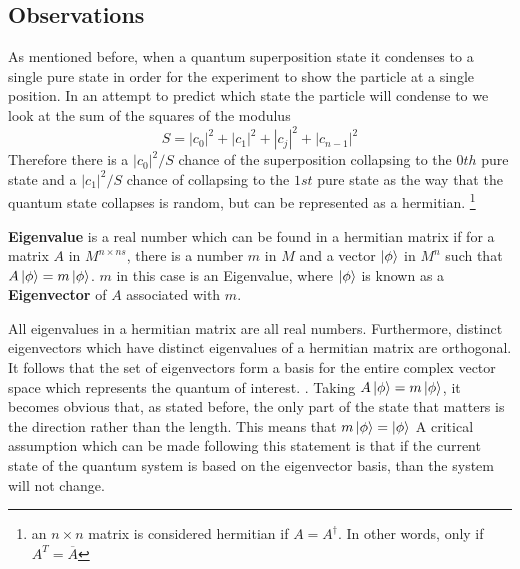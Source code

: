 \documentclass[12pt]{article}
\begin{document}
\subsection{Observations}
As mentioned before, when a quantum superposition state it condenses to a single pure state in order for the experiment to show the particle at a single position. In an attempt to predict which state the particle will condense to we look at the sum of the squares of the modulus\cite{intro} 
$$S = \left|c_0\right|^2 + \left|c_1\right|^2 + \left|c_{j}\right|^2 +\left|c_{n-1}\right|^2$$ 
Therefore there is a $\left|c_0\right|^2\!/S$ chance of the superposition collapsing to the $0th$ pure state and a $\left|c_1\right|^2\!/S$ chance of collapsing to the $1st$ pure state as the way that the quantum state collapses is random, but can be represented as a hermitian.
\footnote{an $ n\times n $ matrix is considered hermitian if $A = A^\dagger $. In other words, only if $ A^T = \overline{A} $}
\par
\textbf{Eigenvalue} is a real number which can be found in a hermitian matrix if for a matrix $A$ in $M^{n\times ns}$, there is a number $m$ in $M$ and a vector $\ket{\phi}$ in $M^n$ such that $A\ket{\phi} = m\ket{\phi}$. $m$ in this case is an Eigenvalue, where $\ket{\phi}$ is known as a \textbf{Eigenvector} of $A$ associated with $m$.\par
All eigenvalues in a hermitian matrix are all real numbers. Furthermore, distinct eigenvectors which have distinct eigenvalues of a hermitian matrix are orthogonal. It follows that the set of eigenvectors form a basis for the entire complex vector space which represents the quantum of interest. \cite{intro}. Taking $A\ket{\phi} = m\ket{\phi}$, it becomes obvious that, as stated before, the only part of the state that matters is the direction rather than the length. This means that $m\ket{\phi} = \ket{\phi}$ A critical assumption which can be made following this statement is that if the current state of the quantum system is based on the eigenvector basis, than the system will not change.
\end{document}
